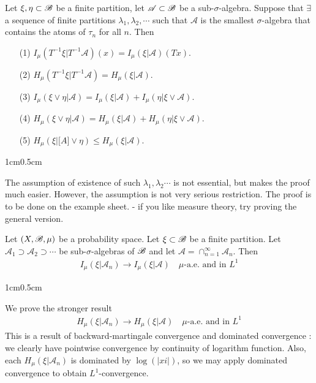 \documentclass[12pt,a4paper]{report}
\newenvironment{proof}
{\begin{changemargin}{1cm}{0.5cm} 
	}%
	{\end{changemargin}
}
\begin{document}
\lem Let $\xi, \eta \subset \mathscr{B}$ be a finite partition, let $\mathscr{A} \subset \mathscr{B}$ be a sub-$\sigma$-algebra. Suppose that $\exists$ a sequence of finite partitions $\lambda_1, \lambda_2, \cdots$ such that $\mathscr{A}$ is the smallest $\sigma$-algebra that contains the atoms of $\tau_n$ for all $n$. Then
\begin{itemize}
\item[(1)] $I_{\mu}(T^{-1}\xi | T^{-1} \mathscr{A})(x) = I_{\mu}(\xi | \mathscr{A}) (Tx)$.
\item[(2)] $H_{\mu}(T^{-1}\xi | T^{-1} \mathscr{A})= H_{\mu}(\xi | \mathscr{A})$.
\item[(3)] $I_{\mu}(\xi \vee \eta  | \mathscr{A}) = I_{\mu}(\xi | \mathscr{A}) + I_{\mu}(\eta | \xi \vee \mathscr{A})$.
\item[(4)] $H_{\mu}(\xi \vee \eta  | \mathscr{A}) = H_{\mu}(\xi | \mathscr{A}) + H_{\mu}(\eta | \xi \vee \mathscr{A})$.
\item[(5)] $H_{\mu}(\xi | \mathscr[A] \vee \eta) \leq H_{\mu}(\xi | \mathscr{A})$.
\end{itemize}
\begin{proof}
The assumption of existence of such $\lambda_1, \lambda_2 \cdots$ is not essential, but makes the proof much easier. However, the assumption is not very serious restriction. The proof is to be done on the example sheet. - if you like measure theory, try proving the general version.
\end{proof}
\s

\prop Let $(X,\mathscr{B}, \mu)$ be a probability space. Let $\xi \subset \mathscr{B}$ be a finite partition. Let $\mathscr{A}_1 \supset \mathscr{A}_2 \supset \cdots$ be sub-$\sigma$-algebras of $\mathscr{B}$ and let $\mathscr{A} = \cap_{n=1}^{\infty} \mathscr{A}_n$. Then
\begin{align*}
I_{\mu} (\xi | \mathscr{A}_n) \rightarrow I_{\mu}(\xi |\mathscr{A}) \quad \mu \text{-a.e. and in } L^1
\end{align*}
\begin{proof}
\pf We prove the stronger result
\begin{align*}
H_{\mu} (\xi | \mathscr{A}_n) \rightarrow H_{\mu}(\xi |\mathscr{A}) \quad \mu \text{-a.e. and in } L^1
\end{align*}
This is a result of backward-martingale convergence and dominated convergence : we clearly have pointwise convergence by continuity of logarithm function. Also, each $H_{\mu}(\xi | \mathscr{A}_n)$ is dominated by $\log(|xi|)$, so we may apply dominated convergence to obtain $L^1$-convergence.

\eop
\end{proof}
\s
\end{document}
